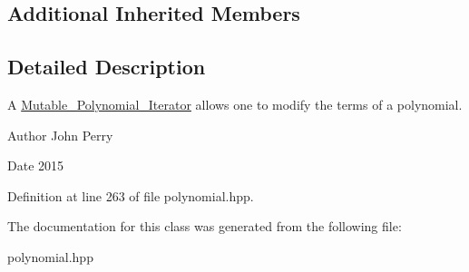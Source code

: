 \subsection*{Additional Inherited Members}


\subsection{Detailed Description}
A \hyperlink{class_mutable___polynomial___iterator}{Mutable\+\_\+\+Polynomial\+\_\+\+Iterator} allows one to modify the terms of a polynomial. 

\begin{DoxyAuthor}{Author}
John Perry 
\end{DoxyAuthor}
\begin{DoxyDate}{Date}
2015 
\end{DoxyDate}


Definition at line 263 of file polynomial.\+hpp.



The documentation for this class was generated from the following file\+:\begin{DoxyCompactItemize}
\item 
polynomial.\+hpp\end{DoxyCompactItemize}
